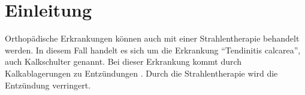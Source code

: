 \section{Einleitung}
\label{sec:Einleitung}

Orthopädische Erkrankungen können auch mit einer Strahlentherapie behandelt werden.
In diesem Fall handelt es sich um die Erkrankung \enquote{Tendinitis calcarea},
auch Kalkschulter genannt. Bei dieser Erkrankung kommt durch Kalkablagerungen zu
Entzündungen \cite{kalkschulter}.
Durch die Strahlentherapie wird die Entzündung verringert.

